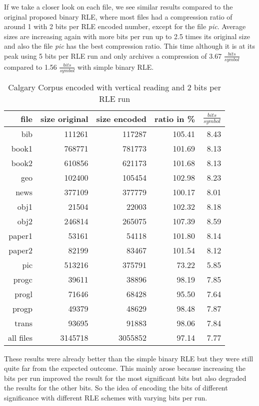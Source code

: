 \par{
If we take a closer look on each file, we see similar results compared to the original proposed binary RLE, where most files had a compression ratio of around 1 with 2 bits per RLE encoded number, except for the file \textit{pic}. Average sizes are increasing again with more bits per run up to 2.5 times its original size and also the file \textit{pic} has the best compression ratio. This time although it is at its peak using 5 bits per RLE run and only archives a compression of 3.67 $\frac{bits}{symbol}$ compared to 1.56 $\frac{bits}{symbol}$ with simple binary RLE.

\begin{table}[h]
	\centering
	\begin{tabular}{r|r|r|r|r}	
		file & size original & size encoded & ratio in \% & $\frac{bits}{symbol}$\\
		\hline
		bib & 111261 & 117287 & 105.41 & 8.43\\
		book1 & 768771 & 781773 & 101.69 & 8.13 \\
		book2 & 610856 & 621173 & 101.68 & 8.13\\
		geo & 102400 & 105454 & 102.98 & 8.23\\
		news & 377109 & 377779 & 100.17 & 8.01\\
		obj1 & 21504 & 22003 & 102.32 & 8.18\\
		obj2& 246814 & 265075 & 107.39 & 8.59\\		 
		paper1 & 53161 & 54118 & 101.80 & 8.14\\		 
		paper2& 82199 & 83467 & 101.54 & 8.12\\		 
		pic & 513216 & 375791 & 73.22 & 5.85\\		 
		progc & 39611 & 38896 & 98.19 & 7.85\\		 
		progl & 71646 & 68428 & 95.50 & 7.64\\		 
		progp & 49379 & 48629 & 98.48 & 7.87\\		 
		trans & 93695 & 91883 & 98.06 & 7.84\\
		\hline
		all files & 3145718 & 3055852 & 97.14 & 7.77
	\end{tabular}
	\caption{Calgary Corpus encoded with vertical reading and 2 bits per RLE run}
	\label{tab:t41 Calgary Corpus encoded with vertical reading and 2 bits per RLE run}
\end{table}	
}
\par{
These results were already better than the simple binary RLE but they were still quite far from the expected outcome. This mainly arose because increasing the bits per run improved the result for the most significant bits but also degraded the results for the other bits. So the idea of encoding the bits of different significance with different RLE schemes with varying bits per run.  
}

